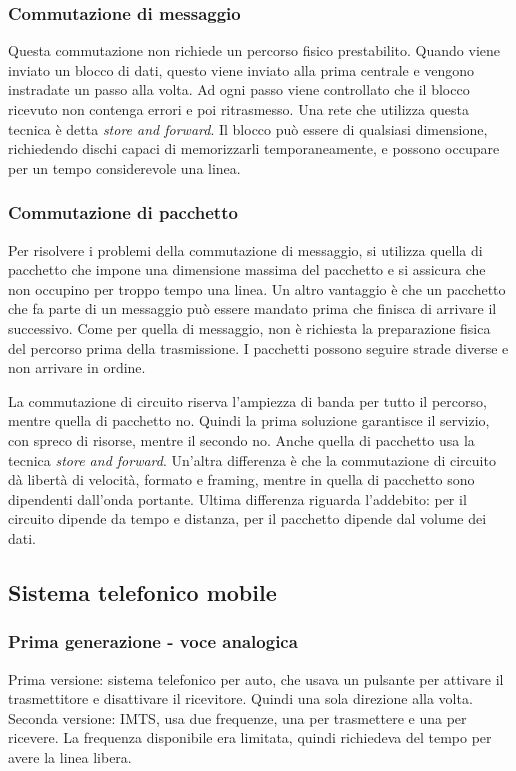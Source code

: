\subsubsection{Commutazione di messaggio}
Questa commutazione non richiede un percorso fisico prestabilito. 
Quando viene inviato un blocco di dati, questo viene inviato alla prima centrale e vengono instradate un passo alla volta. 
Ad ogni passo viene controllato che il blocco ricevuto non contenga errori e poi ritrasmesso.
Una rete che utilizza questa tecnica è detta \textit{store and forward}.
Il blocco può essere di qualsiasi dimensione, richiedendo dischi capaci di memorizzarli temporaneamente, e possono occupare per un tempo considerevole una linea.

\subsubsection{Commutazione di pacchetto}
Per risolvere i problemi della commutazione di messaggio, si utilizza quella di pacchetto che impone una dimensione massima del pacchetto e si assicura che non occupino per troppo tempo una linea.
Un altro vantaggio è che un pacchetto che fa parte di un messaggio può essere mandato prima che finisca di arrivare il successivo.
Come per quella di messaggio, non è richiesta la preparazione fisica del percorso prima della trasmissione.
I pacchetti possono seguire strade diverse e non arrivare in ordine.

La commutazione di circuito riserva l'ampiezza di banda per tutto il percorso, mentre quella di pacchetto no.
Quindi la prima soluzione garantisce il servizio, con spreco di risorse, mentre il secondo no.
Anche quella di pacchetto usa la tecnica \textit{store and forward}. 
Un'altra differenza è che la commutazione di circuito dà libertà di velocità, formato e framing, mentre in quella di pacchetto sono dipendenti dall'onda portante.
Ultima differenza riguarda l'addebito: per il circuito dipende da tempo e distanza, per il pacchetto dipende dal volume dei dati.

\subsection{Sistema telefonico mobile}

\subsubsection{Prima generazione - voce analogica}
Prima versione: sistema telefonico per auto, che usava un pulsante per attivare il trasmettitore e disattivare il ricevitore. Quindi una sola direzione alla volta.\\
Seconda versione: IMTS, usa due frequenze, una per trasmettere e una per ricevere. La frequenza disponibile era limitata, quindi richiedeva del tempo per avere la linea libera.

